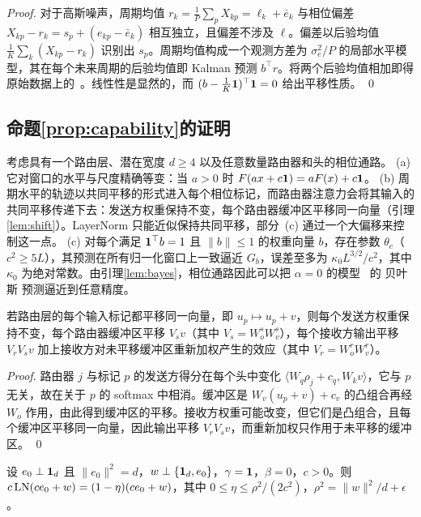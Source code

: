 {\begin{proof}
对于高斯噪声，周期均值 $r_k=\tfrac1P\sum_pX_{kp}=\ell_k+\bar e_k$ 与相位偏差 $X_{kp}-r_k=s_p+(e_{kp}-\bar e_k)$ 相互独立，且偏差不涉及 $\ell$。偏差以后验均值 $\tfrac1K\sum_k(X_{kp}-r_k)$ 识别出 $s_p$。周期均值构成一个观测方差为 $\sigma_e^2/P$ 的局部水平模型，其在每个未来周期的后验均值即 Kalman 预测 $b^\top r$。将两个后验均值相加即得原始数据上的~。线性性是显然的，而 $(b-\tfrac1K\mathbf 1)^\top\mathbf 1=0$ 给出平移性质。 \qed
\end{proof}

\subsection{命题\ref{prop:capability}的证明}

 考虑具有一个路由层、潜在宽度 $d\ge4$ 以及任意数量路由器和头的相位通路。
(a) 它对窗口的水平与尺度精确等变：当 $a>0$ 时 $F(ax+c\mathbf 1)=aF(x)+c\mathbf 1$。
(b) 周期水平的轨迹以共同平移的形式进入每个相位标记，而路由器注意力会将其输入的共同平移传递下去：发送方权重保持不变，每个路由器缓冲区平移同一向量（引理\ref{lem:shift}）。LayerNorm 只能近似保持共同平移，部分~(c) 通过一个大偏移来控制这一点。
(c) 对每个满足 $\mathbf 1^\top b=1$ 且 $\|b\|\le1$ 的权重向量 $b$，存在参数 $\theta_c$（$c^2\ge5L$），其预测在所有归一化窗口上一致逼近 $G_b$，误差至多为 $\kappa_0L^{3/2}/c^2$，其中 $\kappa_0$ 为绝对常数。由引理\ref{lem:bayes}，相位通路因此可以把 $\alpha=0$ 的模型~ 的 贝叶斯 预测逼近到任意精度。

\begin{lemma}[共同平移透传]
\label{lem:shift}
若路由层的每个输入标记都平移同一向量，即 $u_p\mapsto u_p+v$，则每个发送方权重保持不变，每个路由器缓冲区平移 $V_sv$（其中 $V_s=W^s_oW^s_v$），每个接收方输出平移 $V_rV_sv$ 加上接收方对未平移缓冲区重新加权产生的效应（其中 $V_r=W^r_oW^r_v$）。
\end{lemma}

\begin{proof}
路由器 $j$ 与标记 $p$ 的发送方得分在每个头中变化 $\langle W_q\rho_j+c_q,W_kv\rangle$，它与 $p$ 无关，故在关于 $p$ 的 softmax 中相消。缓冲区是 $W_v(u_p+v)+c_v$ 的凸组合再经 $W_o$ 作用，由此得到缓冲区的平移。接收方权重可能改变，但它们是凸组合，且每个缓冲区平移同一向量，因此输出平移 $V_rV_sv$，而重新加权只作用于未平移的缓冲区。 \qed
\end{proof}

\begin{lemma}
\label{lem:ln_linear}
设 $e_0\perp\mathbf 1_d$ 且 $\|e_0\|^2=d$，$w\perp\{\mathbf 1_d,e_0\}$，$\gamma=\mathbf 1$，$\beta=0$，$c>0$。则 $c\operatorname{LN}(ce_0+w)=(1-\eta)(ce_0+w)$，其中 $0\le\eta\le\rho^2/(2c^2)$，$\rho^2=\|w\|^2/d+\epsilon$。
\end{lemma}

}
